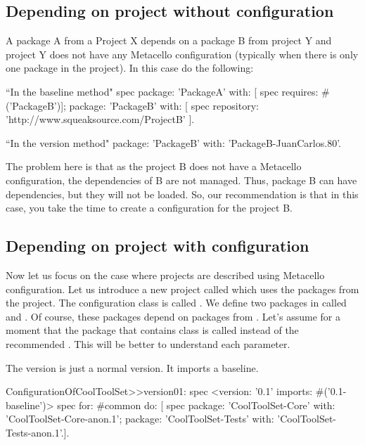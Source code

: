 \documentclass[a4paper,10pt,twoside]{book}
\begin{document}
\subsection{Depending on project without configuration}

A package A from a Project X depends on a package B from project Y and project Y does not have any Metacello configuration (typically when there is only one package in the project). In this case do the following:
\begin{code}{}
              ``In the baseline method"
              spec 
                     package: 'PackageA' with: [  spec requires: #('PackageB')];
                     package: 'PackageB' with: [  spec repository: 'http://www.squeaksource.com/ProjectB' ].       
\end{code}

\begin{code}{}
              ``In the version method"
              package: 'PackageB' with: 'PackageB-JuanCarlos.80'.
\end{code}

The problem here is that as the project B does not have a Metacello configuration, the dependencies of B are not managed. Thus, package B can have dependencies, but they will not be loaded. So, our recommendation is that in this case, you take the time to create a configuration for the project B.

\subsection{Depending on project with configuration}
Now let us focus on the case where projects are described using Metacello configuration.
Let us introduce a new project called  which uses the packages from the  project. The configuration class is called . We define two packages in  called  and . Of course, these packages depend on packages from . Let's assume for a moment that the package that contains  class is called  instead of the recommended . This will be better to understand each parameter. 


The version is just a normal version. It imports a baseline. 
\begin{code}{}
ConfigurationOfCoolToolSet>>version01: spec 
       <version: '0.1' imports: #('0.1-baseline')>
       spec for: #common do: [
              spec 
                     package: 'CoolToolSet-Core' with: 'CoolToolSet-Core-anon.1';
                     package: 'CoolToolSet-Tests' with: 'CoolToolSet-Tests-anon.1'.].       
\end{code}       
\end{document}
